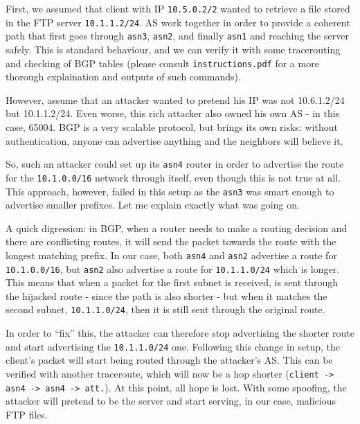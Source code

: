\documentclass[paper=a4]{../../_global/texMemo}
\begin{document}
First, we assumed that client with IP \verb=10.5.0.2/2= wanted to retrieve a file stored in the FTP server \verb=10.1.1.2/24=. AS work together in order to provide a coherent path that first goes through \verb=asn3=, \verb=asn2=, and finally \verb=asn1= and reaching the server safely. This is standard behaviour, and we can verify it with some tracerouting and checking of BGP tables (please consult \verb=instructions.pdf= for a more thorough explaination and outputs of such commands).

However, assume that an attacker wanted to pretend his IP was not 10.6.1.2/24 but 10.1.1.2/24. Even worse, this rich attacker also owned his own AS - in this case, 65004. BGP is a very scalable protocol, but brings its own risks: without authentication, anyone can advertise anything and the neighbors will believe it.

So, such an attacker could set up its \verb=asn4= router in order to advertise the route for the \verb=10.1.0.0/16= network through itself, even though this is not true at all. This approach, however, failed in this setup as the \verb=asn3= was smart enough to advertise smaller prefixes. Let me explain exactly what was going on.

A quick digression: in BGP, when a router needs to make a routing decision and there are conflicting routes, it will send the packet towards the route with the longest matching prefix. In our case, both \verb=asn4= and \verb=asn2= advertise a route for \verb=10.1.0.0/16=, but \verb=asn2= also advertise a route for \verb=10.1.1.0/24= which is longer. This means that when a packet for the first subnet is received, is sent through the hijacked route - since the path is also shorter - but when it matches the second subnet, \verb=10.1.1.0/24=, then it is still sent through the original route.

In order to ``fix'' this, the attacker can therefore stop advertising the shorter route and start advertising the \verb=10.1.1.0/24= one. Following this change in setup, the client's packet will start being routed through the attacker's AS. This can be verified with another traceroute, which will now be a hop shorter (\verb=client -> asn4 -> asn4 -> att.=). At this point, all hope is lost. With some spoofing, the attacker will pretend to be the server and start serving, in our case, malicious FTP files.
\end{document}
